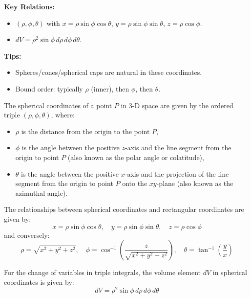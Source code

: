 \documentclass[11pt]{report}
\begin{document}
\begin{keybox}
	\textbf{Key Relations:}
\begin{itemize}
    \item $(\rho,\phi,\theta)$ with $x=\rho\sin\phi\cos\theta$, $y=\rho\sin\phi\sin\theta$, $z=\rho\cos\phi$.
    \item $dV=\rho^2\sin\phi\,d\rho\,d\phi\,d\theta$.
\end{itemize}
	\textbf{Tips:}
\begin{itemize}
    \item Spheres/cones/spherical caps are natural in these coordinates.
    \item Bound order: typically $\rho$ (inner), then $\phi$, then $\theta$.
\end{itemize}
\end{keybox}
\begin{definition}
    The spherical coordinates of a point $P$ in 3-D space are given by the ordered triple $(\rho, \phi, \theta)$, where:
    \begin{itemize}
        \item $\rho$ is the distance from the origin to the point $P$,
        \item $\phi$ is the angle between the positive $z$-axis and the line segment from the origin to point $P$ (also known as the polar angle or colatitude),
        \item $\theta$ is the angle between the positive $x$-axis and the projection of the line segment from the origin to point $P$ onto the $xy$-plane (also known as the azimuthal angle).
    \end{itemize}
    The relationships between spherical coordinates and rectangular coordinates are given by:
    \begin{equation}
        x = \rho \sin \phi \cos \theta, \quad y = \rho \sin \phi \sin \theta, \quad z = \rho \cos \phi
    \end{equation}
    and conversely:
    \begin{equation}
        \rho = \sqrt{x^2 + y^2 + z^2}, \quad \phi = \cos^{-1}\left(\frac{z}{\sqrt{x^2 + y^2 + z^2}}\right), \quad \theta = \tan^{-1}\left(\frac{y}{x}\right)
    \end{equation}

    For the change of variables in triple integrals, the volume element $dV$ in spherical coordinates is given by:
    \begin{equation}
        dV = \rho^2 \sin \phi \, d\rho \, d\phi \, d\theta
    \end{equation}
\end{definition}
\end{document}
